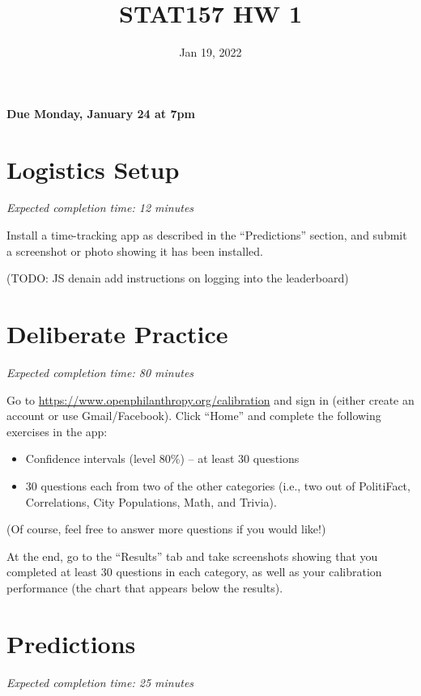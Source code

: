 \documentclass[11pt]{article}
\title{STAT157 HW 1}
\date{Jan 19, 2022}
\begin{document}
\maketitle

\hfill \textbf{Due Monday, January 24 at 7pm}

\section*{Logistics Setup}

\emph{Expected completion time: 12 minutes}

Install a time-tracking app as described in the ``Predictions'' section, and submit a screenshot or photo showing it has been 
installed.

(TODO: JS denain add instructions on logging into the leaderboard)

\section*{Deliberate Practice}

\emph{Expected completion time: 80 minutes}

Go to \url{https://www.openphilanthropy.org/calibration} and sign in (either create an account or use 
Gmail/Facebook). Click ``Home'' and complete the following exercises in the app:

\begin{itemize}

\item Confidence intervals (level 80\%) -- at least 30 questions
\item 30 questions each from two of the other categories (i.e., two out of PolitiFact, Correlations, City Populations, Math, and Trivia).

\end{itemize}

(Of course, feel free to answer more questions if you would like!)

At the end, go to the ``Results'' tab and take screenshots showing that 
you completed at least 30 questions in each category, as well as your calibration 
performance (the chart that appears below the results).

\section*{Predictions}

\emph{Expected completion time: 25 minutes}
\end{document}

